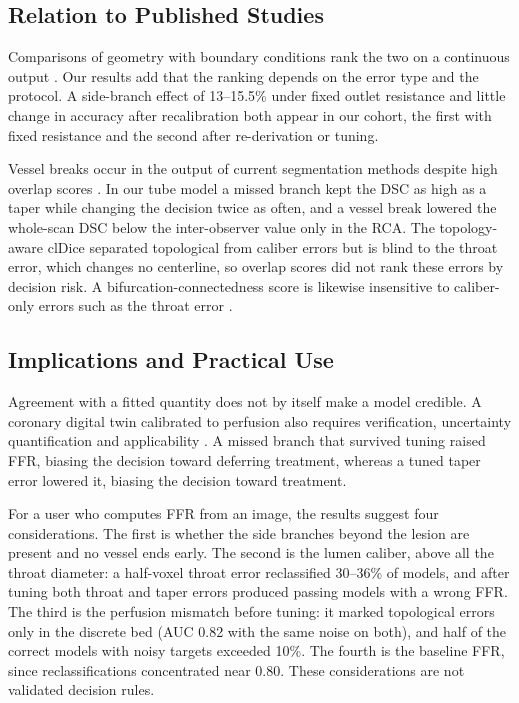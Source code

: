\documentclass[journal,twoside,web]{ieeecolor}
\begin{document}
\subsection{Relation to Published Studies}
Comparisons of geometry with boundary conditions rank the two on a continuous output \cite{sankaran2016,tanade2022,korte2023}.
Our results add that the ranking depends on the error type and the protocol. A side-branch effect of 13--15.5\% under
fixed outlet resistance \cite{gamage2022} and little change in accuracy after recalibration \cite{gosling2020} both
appear in our cohort, the first with fixed resistance and the second after re-derivation or tuning.

Vessel breaks occur in the output of current segmentation methods despite high overlap scores \cite{bransby2026}.
In our tube model a missed branch kept the DSC as high as a taper while changing the decision twice as often, and a vessel break lowered the whole-scan DSC below the inter-observer value only in the RCA. The topology-aware clDice \cite{shit2021} separated topological from caliber errors but is blind to the throat error, which changes no centerline, so overlap scores did not rank these errors by decision risk. A bifurcation-connectedness score is likewise insensitive to caliber-only errors such as the throat error \cite{owusu2026}.

\subsection{Implications and Practical Use}
Agreement with a fitted quantity does not by itself make a model credible. A coronary digital twin calibrated to perfusion also requires verification,
uncertainty quantification and applicability \cite{viceconti2025}. A missed branch that survived tuning raised FFR, biasing the decision toward
deferring treatment, whereas a tuned taper error lowered it, biasing the decision toward treatment.

For a user who computes FFR from an image, the results suggest four considerations. The first is whether the side branches beyond the lesion are present and no vessel ends early.
The second is the lumen caliber, above all the throat diameter: a half-voxel throat error reclassified 30--36\% of models, and after tuning both throat and taper errors produced passing models with a wrong FFR. The third is the perfusion mismatch before tuning: it marked topological errors only in the discrete bed (AUC 0.82 with the same noise on both), and half of the correct models with noisy targets exceeded 10\%. The fourth is the baseline FFR, since reclassifications concentrated near 0.80. These considerations are not validated decision rules.
\end{document}
